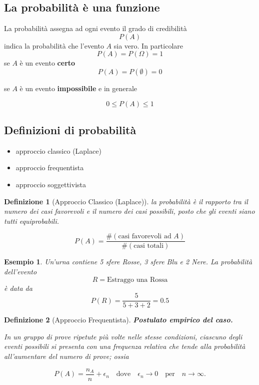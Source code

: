 \documentclass[
  11pt,
]{book}
\providecommand{\tightlist}{%
  \setlength{\itemsep}{0pt}\setlength{\parskip}{0pt}}
\theoremstyle{mytheoremstyle}
\theoremstyle{mydefstyle}
\newtheorem{definition}{Definizione}[section]
\newtheorem{example}{{Esempio}}[section]
\begin{document}
\subsection{La probabilità è una funzione}\label{la-probabilituxe0-uxe8-una-funzione}

La probabilità assegna ad ogni evento il grado di credibilità
\[
P(A)
\]
indica la probabilità che l'evento \(A\) sia vero. In particolare
\[
P(A)=P(\Omega)=1
\]
se \(A\) è un evento \textbf{certo}
\[
P(A)=P(\emptyset)=0
\]

se \(A\) è un evento \textbf{impossibile} e in generale

\[
0\le P(A)\le 1
\]

\subsection{Definizioni di probabilità}\label{definizioni-di-probabilituxe0}

\begin{itemize}
\tightlist
\item
  approccio classico (Laplace)
\item
  approccio frequentista
\item
  approccio soggettivista
\end{itemize}

\begin{info}

\begin{definition}[Approccio Classico (Laplace)]
la probabilità è il rapporto tra il numero dei casi favorevoli e il
numero dei casi possibili, posto che gli eventi siano tutti
equiprobabili.

\[
P(A)=\frac{\#(\text{casi favorevoli ad $A$} )}{\#(\text{casi totali} )}
\]
\end{definition}

\end{info}

\begin{example}
Un'urna contiene 5 sfere Rosse, 3 sfere Blu e 2 Nere. La probabilità
dell'evento
\[
R =\text{Estraggo una Rossa}
\]
è data da
\[
P(R)=\frac{5}{5+3+2}=0.5
\]
\end{example}

\begin{info}

\begin{definition}[Approccio Frequentista]
\textbf{Postulato empirico del caso.}

In un gruppo di prove ripetute più volte \emph{nelle stesse condizioni},
ciascuno degli eventi possibili si presenta con una frequenza relativa
che tende alla probabilità all'aumentare del numero di prove; ossia

\[
P(A)=\frac{n_A}{n}+\epsilon_n
\quad\mbox{dove}\quad \epsilon_{n}\to 0 \quad\mbox{per}\quad n\to\infty .
\]
\end{definition}

\end{info}
\end{document}
